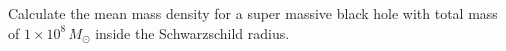 Calculate the mean mass density for a super massive black hole with total mass
of $1 \times 10^8\,M_\odot$ inside the Schwarzschild radius.
